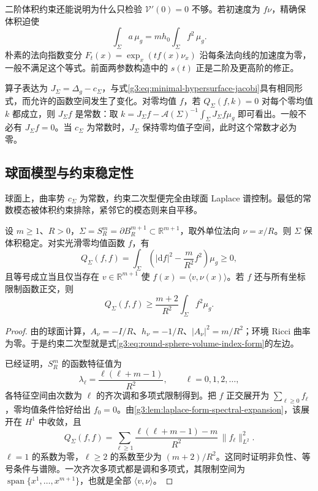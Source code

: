 二阶体积约束还能说明为什么只检验 \(\mathcal V'(0)=0\) 不够。若初速度为 \(f\nu\)，精确保体积迫使
\[
	\int_\Sigma a\,\mu_g=m h_0\int_\Sigma f^2\,\mu_g.
\]
朴素的法向指数变分 \(F_t(x)=\exp_x(t f(x)\nu_x)\) 沿每条法向线的加速度为零，一般不满足这个等式。前面两参数构造中的 \(s(t)\) 正是二阶及更高阶的修正。

\ProseParagraphBreak

算子表达为 \(J_\Sigma=\Delta_g-c_\Sigma\)，与式\eqref{g3:eq:minimal-hypersurface-jacobi}具有相同形式，而允许的函数空间发生了变化。对零均值 \(f\)，若
\(Q_\Sigma(f,k)=0\) 对每个零均值 \(k\) 都成立，则 \(J_\Sigma f\) 是常数：取 \(k=J_\Sigma f-\mathcal A(\Sigma)^{-1}\int_\Sigma J_\Sigma f\mu_g\) 即可看出。一般不必有 \(J_\Sigma f=0\)。当 \(c_\Sigma\) 为常数时，\(J_\Sigma\) 保持零均值子空间，此时这个常数才必为零。

\subsection{球面模型与约束稳定性}
\label{g3:subsec:1905:04}
球面上，曲率势 \(c_\Sigma\) 为常数，约束二次型便完全由球面 Laplace 谱控制。最低的常数模态被体积约束排除，紧邻它的模态则来自平移。

\begin{theorem}\label{g3:thm:round-sphere-volume-stability}
	设 \(m\ge1\)、\(R>0\)，\(\Sigma=S_R^m=\partial B_R^{m+1}\subset\mathbb R^{m+1}\)，取外单位法向 \(\nu=x/R\)。则 \(\Sigma\) 保体积稳定。对实光滑零均值函数 \(f\)，有
	\begin{equation}\label{g3:eq:round-sphere-volume-index-form}
		Q_\Sigma(f,f)=\int_\Sigma\left(|\mathrm df|^2-\frac m{R^2}f^2\right)\mu_g\ge0,
	\end{equation}
	且等号成立当且仅当存在 \(v\in\mathbb R^{m+1}\) 使 \(f(x)=\langle v,\nu(x)\rangle\)。若 \(f\) 还与所有坐标限制函数正交，则
	\begin{equation}\label{g3:eq:round-sphere-constrained-gap}
		Q_\Sigma(f,f)\ge\frac{m+2}{R^2}\int_\Sigma f^2\mu_g.
	\end{equation}
\end{theorem}
\begin{proof}
	由的球面计算，\(A_\nu=-I/R\)、\(h_\nu=-1/R\)、\(|A_\nu|^2=m/R^2\)；环境 Ricci 曲率为零。于是约束二次型就是式\eqref{g3:eq:round-sphere-volume-index-form}的左边。

	已经证明，\(S_R^m\) 的函数特征值为
	\[
		\lambda_\ell=\frac{\ell(\ell+m-1)}{R^2},
		\qquad \ell=0,1,2,\ldots,
	\]
	各特征空间由次数为 \(\ell\) 的齐次调和多项式限制得到。把 \(f\) 正交展开为 \(\sum_{\ell\ge0}f_\ell\)，零均值条件恰好给出 \(f_0=0\)。由\cref{g3:lem:laplace-form-spectral-expansion}，该展开在 \(H^1\) 中收敛，且
	\[
		Q_\Sigma(f,f)
		=\sum_{\ell\ge1}\frac{\ell(\ell+m-1)-m}{R^2}\,
		\|f_\ell\|_{L^2}^2.
	\]
	\(\ell=1\) 的系数为零，\(\ell\ge2\) 的系数至少为 \((m+2)/R^2\)。这同时证明非负性、等号条件与谱隙。一次齐次多项式都是调和多项式，其限制空间为 \(\operatorname{span}\{x^1,\ldots,x^{m+1}\}\)，也就是全部 \(\langle v,\nu\rangle\)。
\end{proof}

